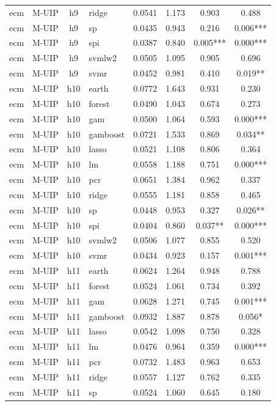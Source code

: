 \begin{ThreePartTable}
\begin{longtable}[t]{llclcccc}
ecm & M-UIP & h9 & ridge & 0.0541 & 1.173 & 0.903 & 0.488\\
ecm & M-UIP & h9 & sp & 0.0435 & 0.943 & 0.216 & 0.006***\\
ecm & M-UIP & h9 & spi & 0.0387 & 0.840 & 0.005*** & 0.000***\\
ecm & M-UIP & h9 & svmlw2 & 0.0505 & 1.095 & 0.905 & 0.696\\
ecm & M-UIP & h9 & svmr & 0.0452 & 0.981 & 0.410 & 0.019**\\
\addlinespace
ecm & M-UIP & h10 & earth & 0.0772 & 1.643 & 0.931 & 0.230\\
ecm & M-UIP & h10 & forest & 0.0490 & 1.043 & 0.674 & 0.273\\
ecm & M-UIP & h10 & gam & 0.0500 & 1.064 & 0.593 & 0.000***\\
ecm & M-UIP & h10 & gamboost & 0.0721 & 1.533 & 0.869 & 0.034**\\
ecm & M-UIP & h10 & lasso & 0.0521 & 1.108 & 0.806 & 0.364\\
ecm & M-UIP & h10 & lm & 0.0558 & 1.188 & 0.751 & 0.000***\\
ecm & M-UIP & h10 & pcr & 0.0651 & 1.384 & 0.962 & 0.337\\
ecm & M-UIP & h10 & ridge & 0.0555 & 1.181 & 0.858 & 0.465\\
ecm & M-UIP & h10 & sp & 0.0448 & 0.953 & 0.327 & 0.026**\\
ecm & M-UIP & h10 & spi & 0.0404 & 0.860 & 0.037** & 0.000***\\
ecm & M-UIP & h10 & svmlw2 & 0.0506 & 1.077 & 0.855 & 0.520\\
ecm & M-UIP & h10 & svmr & 0.0434 & 0.923 & 0.157 & 0.001***\\
\addlinespace
ecm & M-UIP & h11 & earth & 0.0624 & 1.264 & 0.948 & 0.788\\
ecm & M-UIP & h11 & forest & 0.0524 & 1.061 & 0.734 & 0.392\\
ecm & M-UIP & h11 & gam & 0.0628 & 1.271 & 0.745 & 0.001***\\
ecm & M-UIP & h11 & gamboost & 0.0932 & 1.887 & 0.878 & 0.056*\\
ecm & M-UIP & h11 & lasso & 0.0542 & 1.098 & 0.750 & 0.328\\
ecm & M-UIP & h11 & lm & 0.0476 & 0.964 & 0.359 & 0.000***\\
ecm & M-UIP & h11 & pcr & 0.0732 & 1.483 & 0.963 & 0.653\\
ecm & M-UIP & h11 & ridge & 0.0557 & 1.127 & 0.762 & 0.335\\
ecm & M-UIP & h11 & sp & 0.0524 & 1.060 & 0.645 & 0.180\\

\end{longtable}
\end{ThreePartTable}

